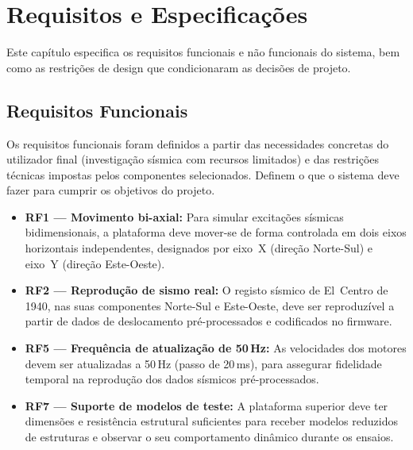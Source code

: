 

\chapter{Requisitos e Especificações}
\label{chapter:requirements}

\begin{introduction}
Este capítulo especifica os requisitos funcionais e não funcionais do sistema, bem como as restrições de design que condicionaram as decisões de projeto.
\end{introduction}



\section{Requisitos Funcionais}
\label{sec:requisitos-funcionais}

Os requisitos funcionais foram definidos a partir das necessidades concretas do utilizador final (investigação sísmica com recursos limitados) e das restrições técnicas impostas pelos componentes selecionados. Definem o que o sistema deve fazer para cumprir os objetivos do projeto.

\begin{itemize}
    \item \textbf{RF1 --- Movimento bi-axial:} Para simular excitações sísmicas bidimensionais, a plataforma deve mover-se de forma controlada em dois eixos horizontais independentes, designados por eixo~X (direção Norte-Sul) e eixo~Y (direção Este-Oeste).

    \item \textbf{RF2 --- Reprodução de sismo real:} O registo sísmico de El~Centro de 1940, nas suas componentes Norte-Sul e Este-Oeste, deve ser reproduzível a partir de dados de deslocamento pré-processados e codificados no firmware.

    \item \textbf{RF5 --- Frequência de atualização de 50\,Hz:} As velocidades dos motores devem ser atualizadas a 50\,Hz (passo de 20\,ms), para assegurar fidelidade temporal na reprodução dos dados sísmicos pré-processados.

    \item \textbf{RF7 --- Suporte de modelos de teste:} A plataforma superior deve ter dimensões e resistência estrutural suficientes para receber modelos reduzidos de estruturas e observar o seu comportamento dinâmico durante os ensaios.
\end{itemize}


